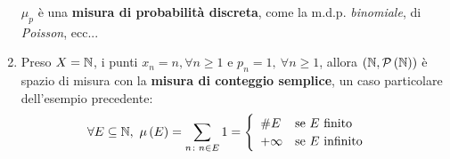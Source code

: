 \begin{exampleswt}
\begin{enumerate}
\begin{equation*}
\end{equation*}
$\mu_p$ è una \textbf{misura di probabilità discreta}, come la m.d.p. \textit{binomiale}, di \textit{Poisson}, ecc...\\
\item Preso $X=\mathbb{N}$, i punti $x_n=n, \forall n\geq 1$ e $p_n=1,\ \forall n\geq 1$, allora $\left(\mathbb{N},\mathcal{P}\left(\mathbb{N}\right)\right)$ è spazio di misura con la \textbf{misura di conteggio semplice}, un caso particolare dell'esempio precedente:
	\begin{equation}
	\forall E\subseteq\naturalset,\ \mu\left(E\right)=\sum_{n\colon n\in E}1=\begin{cases}
		\begin{array}{ll}
			\# E&\text{se }E\text{ finito}\\
			+\infty&\text{se }E\text{ infinito}
		\end{array}
	\end{cases}
\end{equation}
	\end{enumerate}
\end{exampleswt}
